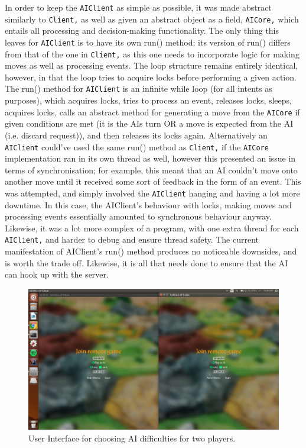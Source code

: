 \documentclass[a4paper,doc]{apa6}
\newcommand{\code}{\texttt}
\begin{document}
In order to keep the \code{AIClient} as simple as possible, it was made abstract similarly to \code{Client,} as well as given an abstract object as a field, \code{AICore,} which entails all processing and decision-making functionality. The only thing this leaves for \code{AIClient} is to have its own run() method; its version of run() differs from that of the one in \code{Client,} as this one needs to incorporate logic for making moves as well as processing events. The loop structure remains entirely identical, however, in that the loop tries to acquire locks before performing a given action. The run() method for \code{AIClient} is an infinite while loop (for all intents as purposes), which acquires locks, tries to process an event, releases locks, sleeps, acquires locks, calls an abstract method for generating a move from the \code{AICore} if given conditions are met (it is the AIs turn OR a move is expected from the AI (i.e. discard request)), and then releases its locks again. Alternatively an \code{AIClient} could’ve used the same run() method as \code{Client,} if the \code{AICore} implementation ran in its own thread as well, however this presented an issue in terms of synchronisation; for example, this meant that an AI couldn’t move onto another move until it received some sort of feedback in the form of an event. This was attempted, and simply involved the \code{AIClient} hanging and having a lot more downtime. In this case, the AIClient’s behaviour with locks, making moves and processing events essentially amounted to synchronous behaviour anyway. Likewise, it was a lot more complex of a program, with one extra thread for each \code{AIClient,} and harder to debug and ensure thread safety. The current manifestation of AIClient’s run() method produces no noticeable downsides, and is worth the trade off. Likewise, it is all that needs done to ensure that the AI can hook up with the server.

\begin{figure}[hbtp]
      \includegraphics[width=\textwidth]{aiSetUp}
      \caption{User Interface for choosing AI difficulties for two players.}
\end{figure}
\end{document}
